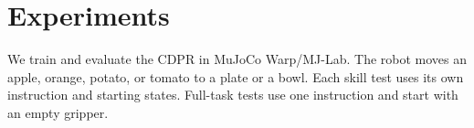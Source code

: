 \section{Experiments}\label{sec:experiments}
We train and evaluate the CDPR in MuJoCo Warp/MJ-Lab. The robot moves an apple, orange, potato, or tomato to a plate or a bowl. Each skill test uses its own instruction and starting states. Full-task tests use one instruction and start with an empty gripper.







